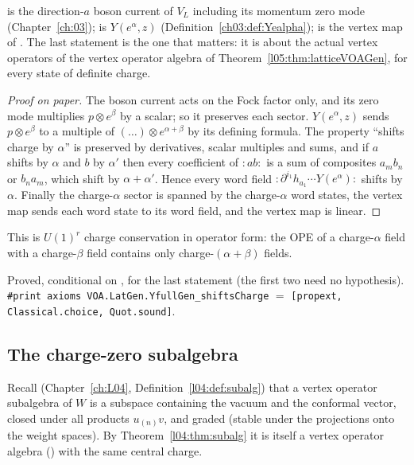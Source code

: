 \begin{dictionary}
 is the direction-$a$ boson current of $V_L$ including its momentum zero mode
(Chapter~\ref{ch:03});  is $Y(e^\alpha,z)$ (Definition~\ref{ch03:def:Yealpha});  is the
vertex map of . The last statement is the one that matters: it is about the actual vertex
operators of the vertex operator algebra of Theorem~\ref{l05:thm:latticeVOAGen}, for every state of definite charge.
\end{dictionary}

\begin{proof}[Proof on paper]
The boson current acts on the Fock factor only, and its zero mode multiplies $p\otimes e^\beta$ by a scalar; so it
preserves each sector. $Y(e^\alpha,z)$ sends $p\otimes e^\beta$ to a multiple of $(\ldots)\otimes e^{\alpha+\beta}$ by its
defining formula. The property ``shifts charge by $\alpha$'' is preserved by derivatives, scalar multiples and sums,
and if $a$ shifts by $\alpha$ and $b$ by $\alpha'$ then every coefficient of ${:}ab{:}$ is a sum of composites $a_mb_n$
or $b_na_m$, which shift by $\alpha+\alpha'$. Hence every word field ${:}\partial^{i_1}h_{a_1}\cdots Y(e^\alpha){:}$ shifts by
$\alpha$. Finally the charge-$\alpha$ sector is spanned by the charge-$\alpha$ word states, the vertex map sends each word
state to its word field, and the vertex map is linear.
\end{proof}

\begin{physics}
This is $U(1)^r$ charge conservation in operator form: the OPE of a charge-$\alpha$ field with a charge-$\beta$ field
contains only charge-$(\alpha+\beta)$ fields.
\end{physics}

\begin{status}
Proved, conditional on ,  for the last statement (the first two need no hypothesis).
\texttt{\#print axioms VOA.LatGen.YfullGen\_shiftsCharge} $=$ \texttt{[propext, Classical.choice, Quot.sound]}.
\end{status}

\subsection{The charge-zero subalgebra}

Recall (Chapter~\ref{ch:L04}, Definition~\ref{l04:def:subalg}) that a vertex operator subalgebra of $W$ is a subspace
containing the vacuum and the conformal vector, closed under all products $u_{(n)}v$, and graded (stable under the
projections onto the weight spaces). By Theorem~\ref{l04:thm:subalg} it is itself a vertex operator algebra
() with the same central charge.

